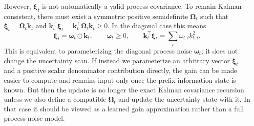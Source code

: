 \documentclass[11pt]{article}
\newcommand{\ve}[1]{\boldsymbol{#1}}
\newcommand{\tr}{\intercal}
\begin{document}
However, $\ve{\xi}_t$ is not automatically a valid process covariance. To remain
Kalman-consistent, there must exist a symmetric positive semidefinite $\ve{\Omega}_t$ such that
$\ve{\xi}_t=\ve{\Omega}_t\ve{k}_t$ and
$\ve{k}_t^{\tr}\ve{\xi}_t=\ve{k}_t^{\tr}\ve{\Omega}_t\ve{k}_t\ge 0$. In the diagonal case this
means
\[
  \ve{\xi}_t=\ve{\omega}_t\odot\ve{k}_t,
  \qquad
  \ve{\omega}_t\ge 0,
  \qquad
  \ve{k}_t^{\tr}\ve{\xi}_t=\sum_i\omega_{t,i}k_{t,i}^2.
\]
This is equivalent to parameterizing the diagonal process noise $\ve{\omega}_t$; it does not
change the uncertainty scan. If instead we parameterize an arbitrary vector $\ve{\xi}_t$ and a
positive scalar denominator contribution directly, the gain can be made easier to compute and
remains input-only once the prefix information state is known. But then the update is no
longer the exact Kalman covariance recursion unless we also define a compatible
$\ve{\Omega}_t$ and update the uncertainty state with it. In that case it should be viewed as a
learned gain approximation rather than a full process-noise model.
\end{document}
